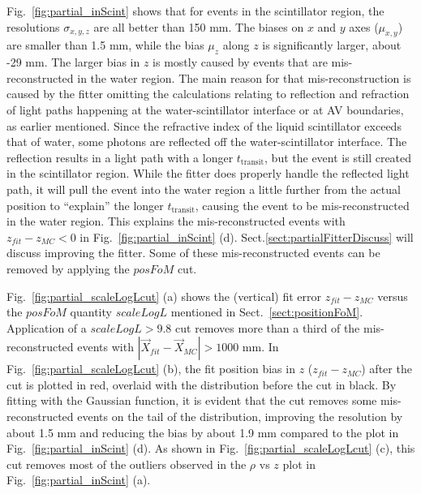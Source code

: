 Fig.~\ref{fig:partial_inScint} shows that for events in the scintillator region, the resolutions $\sigma_{x,y,z}$ are all better than 150 mm. The biases on $x$ and $y$ axes ($\mu_{x,y}$) are smaller than 1.5 mm, while the bias $\mu_z$ along $z$ is significantly larger, about -29 mm. The larger bias in $z$ is mostly caused by events that are mis-reconstructed in the water region. The main reason for that mis-reconstruction is caused by the fitter omitting the calculations relating to reflection and refraction of light paths happening at the water-scintillator interface or at AV boundaries, as earlier mentioned. Since the refractive index of the liquid scintillator exceeds that of water, some photons are reflected off the water-scintillator interface. The reflection results in a light path with a longer $t_\mathrm{transit}$, but the event is still created in the scintillator region. While the fitter does properly handle the reflected light path, it will pull the event into the water region a little further from the actual position to ``explain'' the longer $t_\mathrm{transit}$, causing the event to be mis-reconstructed in the water region. This explains the mis-reconstructed events with $z_{fit}-z_{MC}<0$ in Fig.~\ref{fig:partial_inScint} (d). Sect.\ref{sect:partialFitterDiscuss} will discuss improving the fitter. Some of these mis-reconstructed events can be removed by applying the $posFoM$ cut. 

Fig.~\ref{fig:partial_scaleLogLcut} (a) shows the (vertical) fit error $z_{fit}-z_{MC}$ versus the $posFoM$ quantity $scaleLogL$ mentioned in Sect.~\ref{sect:positionFoM}. Application of a $scaleLogL>9.8$ cut removes more than a third of the mis-reconstructed events with $|\vec{X}_{fit}-\vec{X}_{MC}|>1000$ mm. In Fig.~\ref{fig:partial_scaleLogLcut} (b), the fit position bias in $z$ ($z_{fit}-z_{MC}$) after the cut is plotted in red, overlaid with the distribution before the cut in black. By fitting with the Gaussian function, it is evident that the cut removes some mis-reconstructed events on the tail of the distribution, improving the resolution by about 1.5 mm and reducing the bias by about 1.9 mm compared to the plot in Fig.~\ref{fig:partial_inScint} (d). As shown in Fig.~\ref{fig:partial_scaleLogLcut} (c), this cut removes most of the outliers observed in the $\rho$ vs $z$ plot in Fig.~\ref{fig:partial_inScint} (a).

